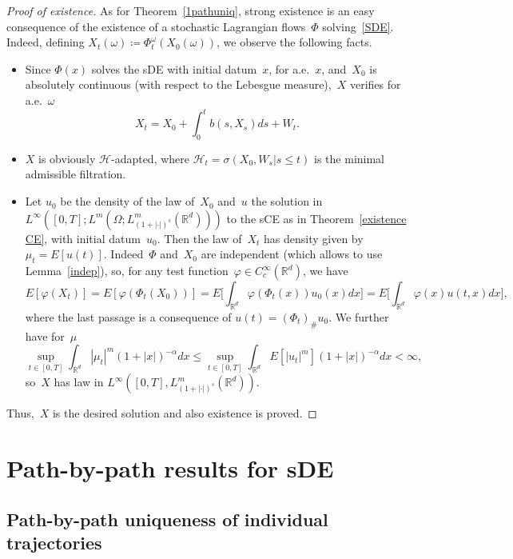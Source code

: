 \documentclass[a4paper,10pt]{article}
\newcommand\1{\mathbbm{1}}
\newcommand{\mr}{\mathbb{R}}
\newcommand{\mc}{\mathcal}
\numberwithin{equation}{section}
\begin{document}
\begin{proof}[Proof of existence]
As for Theorem~\ref{1pathuniq}, strong existence is an easy consequence of the existence of a stochastic Lagrangian flows~$\Phi$ solving~\eqref{SDE}. Indeed, defining $X_t(\omega)\coloneqq \Phi_t^\omega(X_0(\omega))$, we observe the following facts.
\begin{itemize}
\item Since $\Phi(x)$ solves the sDE with initial datum~$x$, for a.e.~$x$, and~$X_0$ is absolutely continuous (with respect to the Lebesgue measure),~$X$ verifies for a.e.~$\omega$
\begin{equation*}
X_t=X_0+\int^t_0 b(s,X_s)ds+W_t.
\end{equation*}
\item $X$ is obviously $\mc{H}$-adapted, where $\mc{H}_t=\sigma(X_0,W_s|s\le t)$ is the minimal admissible filtration.
\item Let $u_0$ be the density of the law of~$X_0$ and~$u$ the solution in $L^\infty([0,T];L^m(\Omega;L^m_{(1+|\cdot|)^s}(\mr^d)))$ to the sCE as in Theorem~\ref{existence CE}, with initial datum~$u_0$. Then the law of~$X_t$ has density given by $\mu_t=E[u(t)]$. Indeed~$\Phi$ and~$X_0$ are independent (which allows to use Lemma~\ref{indep}), so, for any test function~$\varphi \in C_c^\infty(\mr^d)$, we have
\begin{equation*}
E[\varphi(X_t)]=E[\varphi(\Phi_t(X_0))]=E\Big[\int_{\mr^d}\varphi(\Phi_t(x))u_0(x)dx\Big] =E\Big[\int_{\mr^d}\varphi(x)u(t,x)dx\Big],
\end{equation*}
where the last passage is a consequence of $u(t)=(\Phi_t)_\#u_0$. We further have for~$\mu$
\begin{equation*}
\sup_{t\in[0,T]}\int_{\mr^d}|\mu_t|^m(1+|x|)^{-\alpha}dx\le \sup_{t\in[0,T]}\int_{\mr^d}E[|u_t|^m](1+|x|)^{-\alpha}dx <\infty ,
\end{equation*}
so~$X$ has law in $L^\infty([0,T],L^m_{(1+|\cdot|)^s}(\mr^d))$.
\end{itemize}
Thus,~$X$ is the desired solution and also existence is proved.
\end{proof}

\section{Path-by-path results for sDE}

\subsection{Path-by-path uniqueness of individual trajectories}
\end{document}
